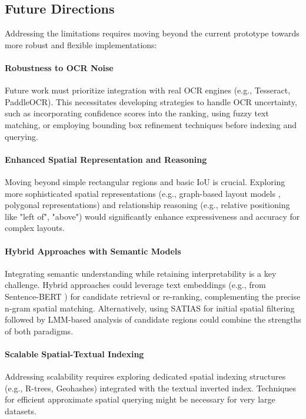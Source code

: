 \documentclass[manuscript,screen]{acmart}
\begin{document}
\subsection{Future Directions}

Addressing the limitations requires moving beyond the current prototype towards more robust and flexible implementations:

\paragraph{Robustness to OCR Noise}
Future work must prioritize integration with real OCR engines (e.g., Tesseract, PaddleOCR). This necessitates developing strategies to handle OCR uncertainty, such as incorporating confidence scores into the ranking, using fuzzy text matching, or employing bounding box refinement techniques before indexing and querying.

\paragraph{Enhanced Spatial Representation and Reasoning}
Moving beyond simple rectangular regions and basic IoU is crucial. Exploring more sophisticated spatial representations (e.g., graph-based layout models \cite{Johnson18SceneGraphs}, polygonal representations) and relationship reasoning (e.g., relative positioning like "left of", "above") would significantly enhance expressiveness and accuracy for complex layouts.

\paragraph{Hybrid Approaches with Semantic Models}
Integrating semantic understanding while retaining interpretability is a key challenge. Hybrid approaches could leverage text embeddings (e.g., from Sentence-BERT \cite{Reimers19SentenceBERT}) for candidate retrieval or re-ranking, complementing the precise n-gram spatial matching. Alternatively, using SATIAS for initial spatial filtering followed by LMM-based analysis of candidate regions could combine the strengths of both paradigms.

\paragraph{Scalable Spatial-Textual Indexing}
Addressing scalability requires exploring dedicated spatial indexing structures (e.g., R-trees, Geohashes) integrated with the textual inverted index. Techniques for efficient approximate spatial querying might be necessary for very large datasets.
\end{document}
